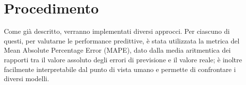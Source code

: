 
\vspace{1cm}
{\let\clearpage\relax \chapter{Procedimento}} 

Come già descritto, verranno implementati diversi approcci. Per ciascuno di questi, per valutarne le performance predittive, è stata utilizzata la metrica del Mean Absolute Percentage Error (MAPE), dato dalla media aritmentica dei rapporti tra il valore assoluto degli errori di previsione e il valore reale; è inoltre facilmente interpretabile dal punto di vista umano e permette di confrontare i diversi modelli. 










